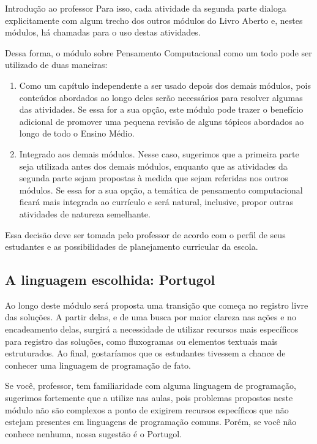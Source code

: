 \begin{apresentacao}{Introdução ao professor}
Para isso, cada atividade da segunda parte dialoga explicitamente com algum trecho dos outros módulos do Livro Aberto e, nestes módulos, há chamadas para o uso destas atividades.

Dessa forma, o módulo sobre Pensamento Computacional como um todo pode ser utilizado de duas maneiras:

\begin{enumerate}
\item Como um capítulo independente a ser usado depois dos demais módulos, pois conteúdos abordados ao longo deles serão necessários para resolver algumas das atividades. Se essa for a sua opção, este módulo pode trazer o benefício adicional de promover uma pequena revisão de alguns tópicos abordados ao longo de todo o Ensino Médio.
\item Integrado aos demais módulos. Nesse caso, sugerimos que a primeira parte seja utilizada antes dos demais módulos, enquanto que as atividades da segunda parte sejam propostas à medida que sejam referidas nos outros módulos. Se essa for a sua opção, a temática de pensamento computacional ficará mais integrada ao currículo e será natural, inclusive, propor outras atividades de natureza semelhante.
\end{enumerate}

Essa decisão deve ser tomada pelo professor de acordo com o perfil de seus estudantes e as possibilidades de planejamento curricular da escola.

\subsection{A linguagem escolhida: Portugol}

Ao longo deste módulo será proposta uma transição que começa no registro livre das soluções. A partir delas, e de uma busca por maior clareza nas ações e no encadeamento delas, surgirá a necessidade de utilizar recursos mais específicos para registro das soluções, como fluxogramas ou elementos textuais mais estruturados. Ao final, gostaríamos que os estudantes tivessem a chance de conhecer uma linguagem de programação de fato.

Se você, professor, tem familiaridade com alguma linguagem de programação, sugerimos fortemente que a utilize nas aulas, pois problemas propostos neste módulo não são complexos a ponto de exigirem recursos específicos que não estejam presentes em linguagens de programação comuns. Porém, se você não conhece nenhuma, nossa sugestão é o Portugol.


\end{apresentacao}
